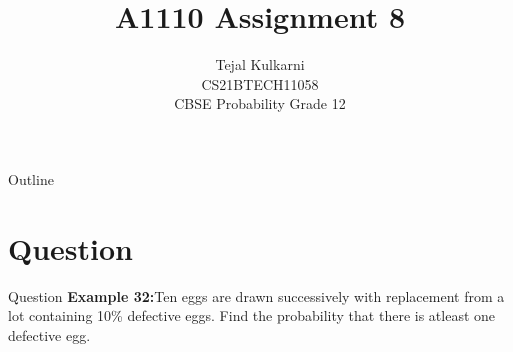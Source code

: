 \documentclass{beamer}
\title{A1110 Assignment 8 }
\author{Tejal Kulkarni \\ CS21BTECH11058 \\\vspace*{20pt} CBSE Probability Grade 12 }
\begin{document}
\providecommand{\pr}[1]{\ensuremath{\Pr\left(#1\right)}}
\providecommand{\cdf}[2]{\ensuremath{\text{F}_{#1}\left(#2\right)}}
\providecommand{\qfunc}[1]{\ensuremath{Q\left(#1\right)}}
\providecommand{\sbrak}[1]{\ensuremath{{}\left[#1\right]}}
\providecommand{\lsbrak}[1]{\ensuremath{{}\left[#1\right.}}
\providecommand{\rsbrak}[1]{\ensuremath{{}\left.#1\right]}}
\providecommand{\brak}[1]{\ensuremath{\left(#1\right)}}
\providecommand{\lbrak}[1]{\ensuremath{\left(#1\right.}}
\providecommand{\rbrak}[1]{\ensuremath{\left.#1\right)}}
\providecommand{\cbrak}[1]{\ensuremath{\left\{#1\right\}}}
\providecommand{\lcbrak}[1]{\ensuremath{\left\{#1\right.}}
\providecommand{\rcbrak}[1]{\ensuremath{\left.#1\right\}}}
\newcommand*{\permcomb}[4][0mu]{{{}^{#3}\mkern#1#2_{#4}}}
\newcommand*{\perm}[1][-3mu]{\permcomb[#1]{P}}
\newcommand*{\comb}[1][-1mu]{\permcomb[#1]{C}}
\renewcommand{\thetable}{\arabic{table}} 

\begin{frame}
    \titlepage
\end{frame}

\begin{frame}{Outline}
  \tableofcontents
\end{frame}

\section{Question}
\begin{frame}{Question}
 \textbf{Example 32:}Ten eggs are drawn successively with replacement from a lot containing 10\% defective eggs. Find the probability that there is atleast one defective egg.    
\end{frame}
\end{document}
